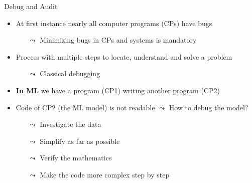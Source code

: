 \documentclass[11pt,compress,t,notes=noshow, aspectratio=169, xcolor=table]{beamer}
\begin{document}
\begin{frame}[c]{Debug and Audit}
    \begin{itemize}
        \item At first instance nearly all computer programs (CPs) have bugs
        \begin{itemize}
            \item[$\leadsto$] Minimizing bugs in CPs and systems is mandatory
        \end{itemize}
        \item Process with multiple steps to locate, understand and solve a problem
        \begin{itemize}
            \item[$\leadsto$] Classical debugging
        \end{itemize}
        \item \textbf{In ML} we have a program (CP1) writing another program (CP2)
        \item Code of CP2 (the ML model) is not readable $\leadsto$ How to debug the model?
        \begin{itemize}
            \item[$\leadsto$] Investigate the data
            \item[$\leadsto$] Simplify as far as possible
            \item[$\leadsto$] Verify the mathematics
            \item[$\leadsto$] Make the code more complex step by step
        \end{itemize}
    \end{itemize}
\end{frame}



\end{document}
